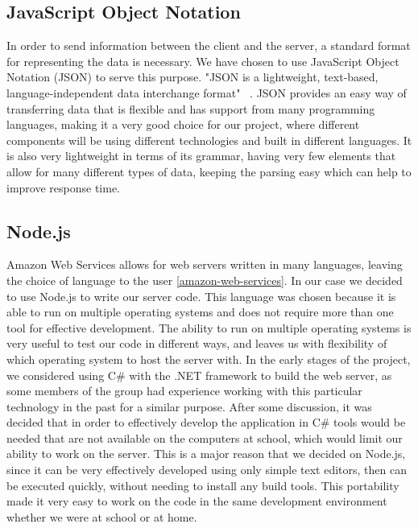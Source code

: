 \documentclass[12pt]{report}
\let\Oldsubsection\subsection
\renewcommand{\subsection}{\FloatBarrier\Oldsubsection}
\begin{document}
\subsection{JavaScript Object Notation} \label{javascript-object-notation}


In order to send information between the client and the server, a standard format for
representing the data is necessary. We have chosen to use JavaScript Object Notation (JSON) to
serve this purpose. "JSON is a lightweight, text-based, language-independent data interchange
format" ~\autocite{JSONREF}. JSON provides an easy way of transferring data that is flexible and has support
from many programming languages, making it a very good choice for our project, where
different components will be using different technologies and built in different languages. It is
also very lightweight in terms of its grammar, having very few elements that allow for many
different types of data, keeping the parsing easy which can help to improve response time.

\subsection{Node.js} \label{node.js}

Amazon Web Services allows for web
servers written in many languages, leaving the choice of language to the user \ref{amazon-web-services}.
In our case we
decided to use Node.js to write our server code. This language was chosen because it is able to
run on multiple operating systems and does not require more than one tool for effective development.
The ability to run on multiple operating systems is very useful to test our code in different ways,
and leaves us with flexibility of which operating system to host the server with. In the early
stages of the project, we considered using C\# with the .NET framework to build the web server,
as some members of the group had experience working with this particular technology in the past
for a similar purpose. After some discussion, it was decided that in order to effectively develop
the application in C\# tools would be needed that are not available on the computers at school,
which would limit our ability to work on the server. This is a major reason that we decided on
Node.js, since it can be very effectively developed using only simple text editors, then can be
executed quickly, without needing to install any build tools. This portability made it very easy to
work on the code in the same development environment whether we were at school or at home.
\end{document}
